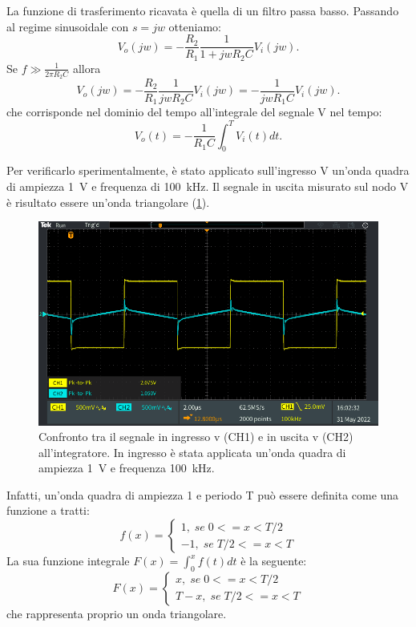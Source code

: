 \noindent
La funzione di trasferimento ricavata è quella di un filtro passa basso. Passando al regime sinusoidale con $s=jw$ otteniamo:
\begin{equation}
	V_o(jw)=-\frac{R_2}{R_1}\frac{1}{1+jwR_2C}V_i(jw).
\end{equation}
Se $f\gg\frac{1}{2\pi R_2C}$ allora 
\begin{equation}
	V_o(jw)=-\frac{R_2}{R_1}\frac{1}{jwR_2C}V_i(jw)=-\frac{1}{jwR_1C}V_i(jw).
\end{equation}
che corrisponde nel dominio del tempo all'integrale del segnale V nel tempo:
\begin{equation}
	V_o(t)=-\frac{1}{R_1C}\int_0^TV_i(t) dt.
\end{equation}

\noindent
Per verificarlo sperimentalmente, è stato applicato sull'ingresso V un'onda quadra di ampiezza \SI{1}{\volt} e frequenza di \SI{100}{\kilo\hertz}. Il segnale in uscita misurato sul nodo V è risultato essere un'onda triangolare (\Fig\ref{fig:opamp_int_quadra}).
\begin{figure}[h!]
	\centering
	\includegraphics[width=1\linewidth]{./ImageFiles/Laboratorio 4/TEK00016}
	\caption{Confronto tra il segnale in ingresso v (CH1)  e in uscita v (CH2) all'integratore. In ingresso è stata applicata un'onda quadra di ampiezza \SI{1}{\volt} e frequenza \SI{100}{\kilo\hertz}.}
	\label{fig:opamp_int_quadra}
\end{figure}

\noindent
Infatti, un'onda quadra di ampiezza 1 e periodo T può essere definita come una funzione a tratti:
\begin{equation}
	f(x)=
	\begin{cases}
		1,\;se\;0<=x<T/2 \\
		-1,\;se\;T/2<=x<T 
	\end{cases}
\end{equation}
La sua funzione integrale $F(x)=\int_0^xf(t)dt$ è la seguente:
\begin{equation}
	F(x)=
	\begin{cases}
		x,\;se\;0<=x<T/2 \\
		T-x,\;se\;T/2<=x<T 
	\end{cases}
\end{equation}
che rappresenta proprio un onda triangolare.


